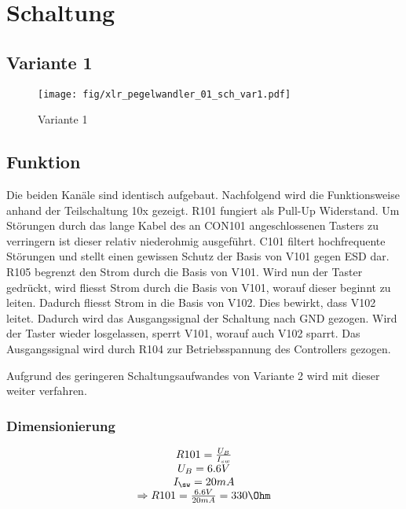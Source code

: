 
\section{Schaltung}

\subsection{Variante 1}
\begin{figure}[h!]
	\centering
	\texttt{[image: fig/xlr\_pegelwandler\_01\_sch\_var1.pdf]}
	\caption{Variante 1}
	\label{sch:var1}
\end{figure}

\subsection{Funktion}
Die beiden Kanäle sind identisch aufgebaut. Nachfolgend wird die Funktionsweise anhand der Teilschaltung 10x gezeigt. R101 fungiert als Pull-Up Widerstand. Um Störungen durch das lange Kabel des an CON101 angeschlossenen Tasters zu verringern ist dieser relativ niederohmig ausgeführt. C101 filtert hochfrequente Störungen und stellt einen gewissen Schutz der Basis von V101 gegen ESD dar. R105 begrenzt den Strom durch die Basis von V101. Wird nun der Taster gedrückt, wird fliesst Strom durch die Basis von V101, worauf dieser beginnt zu leiten. Dadurch fliesst Strom in die Basis von V102. Dies bewirkt, dass V102 leitet. Dadurch wird das Ausgangssignal der Schaltung nach GND gezogen. Wird der Taster wieder losgelassen, sperrt V101, worauf auch V102 sparrt. Das Ausgangssignal wird durch R104 zur Betriebsspannung des Controllers gezogen. 

Aufgrund des geringeren Schaltungsaufwandes von Variante 2 wird mit dieser weiter verfahren. 

\subsubsection{Dimensionierung}
\[ \begin{matrix} R101 = \frac{U_B}{I_{sw}}\\
U_B = 6.6 V\\
I_\sw = 20 mA\\
\Rightarrow R101 = \frac{6.6V}{20mA} = 330 \Ohm
\end{matrix} \]



